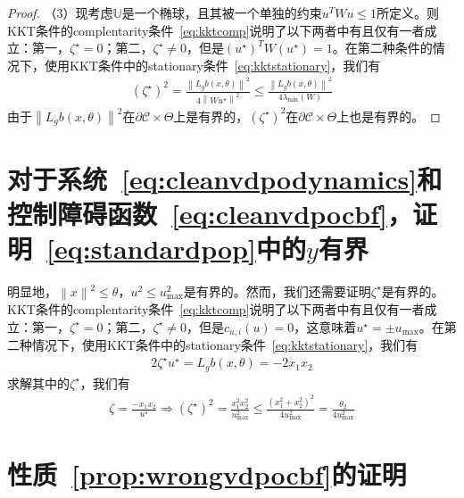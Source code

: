 \begin{proof}
  （3）现考虑$\mathbb{U}$是一个椭球，且其被一个单独的约束$u^T W u \le 1$所定义。则KKT条件的complentarity条件~\eqref{eq:kktcomp}说明了以下两者中有且仅有一者成立：第一，$\zeta^\star=0$；第二，$\zeta^\star \ne 0$，但是$(u^\star)^T W (u^\star) = 1$。在第二种条件的情况下，使用KKT条件中的stationary条件~\eqref{eq:kktstationary}，我们有
  \begin{eqnarray}
    (\zeta^\star)^2 = \frac{
      \left\lVert L_gb(x, \theta) \right\rVert^2
    }{4 \left\lVert W u^\star \right\rVert^2} 
    \le \frac{
      \left\lVert L_gb(x, \theta) \right\rVert^2
    }{4 \lambda_{\min}(W)} 
  \end{eqnarray}
  由于$\left\lVert L_gb(x, \theta) \right\rVert^2$在$\partial \mathcal{C} \times \Theta$上是有界的，$(\zeta^\star)^2$在$\partial \mathcal{C} \times \Theta$上也是有界的。
\end{proof}

\section{对于系统~\eqref{eq:cleanvdpodynamics}和控制障碍函数~\eqref{eq:cleanvdpocbf}，证明~\eqref{eq:standardpop}中的$y$有界}
\label{app:bound:y:cleanvdp}

明显地，$\left\lVert x \right\rVert^2 \le \theta$，$u^2 \le u_{\max}^2$是有界的。然而，我们还需要证明$\zeta^\star$是有界的。KKT条件的complentarity条件~\eqref{eq:kktcomp}说明了以下两者中有且仅有一者成立：第一，$\zeta^\star=0$；第二，$\zeta^\star \ne 0$，但是$c_{u,i}(u) = 0$，这意味着$u^\star = \pm u_{\max}$。在第二种情况下，使用KKT条件中的stationary条件~\eqref{eq:kktstationary}，我们有
\begin{eqnarray}
  2\zeta^\star u^\star = L_gb(x, \theta) = -2 x_1 x_2
\end{eqnarray}
求解其中的$\zeta^\star$，我们有
\begin{eqnarray}
  \zeta = \frac{-x_1 x_2}{u^\star} \Rightarrow 
  (\zeta^\star)^2 = \frac{x_1^2 x_2^2}{u_{\max}^2} \le \frac{
    (x_1^2 + x_2^2)^2
  }{4 u_{\max}^2} = \frac{\theta_2}{4 u_{\max}^2}
\end{eqnarray}

\section{性质~\ref{prop:wrongvdpocbf}的证明}
\label{app:proofwrongvdpocbf}


